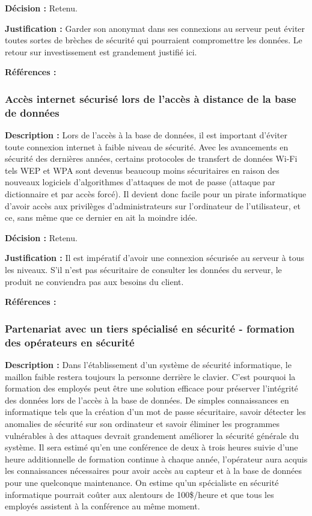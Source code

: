 \textbf{Décision :} Retenu.

\textbf{Justification :} Garder son anonymat dans ses connexions au serveur peut éviter toutes sortes de brèches de sécurité qui pourraient compromettre les données. Le retour sur investissement est grandement justifié ici.

\textbf{Références :} \cite{vpn} \cite{juniper}

\subsubsection{Accès internet sécurisé lors de l’accès à distance de la base de données}

\textbf{Description :} Lors de l’accès à la base de données, il est important d’éviter toute connexion internet à faible niveau de sécurité. Avec les avancements en sécurité des dernières années, certains protocoles de transfert de données Wi-Fi tels WEP et WPA sont devenus beaucoup moins sécuritaires en raison des nouveaux logiciels d’algorithmes d’attaques de mot de passe (attaque par dictionnaire et par accès forcé). Il devient donc facile pour un pirate informatique d’avoir accès aux privilèges d’administrateurs sur l’ordinateur de l’utilisateur, et ce, sans même que ce dernier en ait la moindre idée.

\textbf{Décision :}  Retenu.

\textbf{Justification :}  Il est impératif d’avoir une connexion sécurisée au serveur à tous les niveaux. S’il n’est pas sécuritaire de consulter les données du serveur, le produit ne conviendra pas aux besoins du client.

\textbf{Références :} \cite{webopedia}

\subsubsection{Partenariat avec un tiers spécialisé en sécurité - formation des opérateurs en sécurité}

\textbf{Description :} Dans l’établissement d’un système de sécurité informatique, le maillon faible restera toujours la personne derrière le clavier. C’est pourquoi la formation des employés peut être une solution efficace pour préserver l’intégrité des données lors de l’accès à la base de données. De simples connaissances en informatique tels que la création d’un mot de passe sécuritaire, savoir détecter les anomalies de sécurité sur son ordinateur et savoir éliminer les programmes vulnérables à des attaques devrait grandement améliorer la sécurité générale du système. Il sera estimé qu’en une conférence de deux à trois heures suivie d’une heure additionnelle de formation continue à chaque année, l’opérateur aura acquis les connaissances nécessaires pour avoir accès au capteur et à la base de données pour une quelconque maintenance. On estime qu’un spécialiste en sécurité informatique pourrait coûter aux alentours de 100\$/heure et que tous les employés assistent à la conférence au même moment. 

